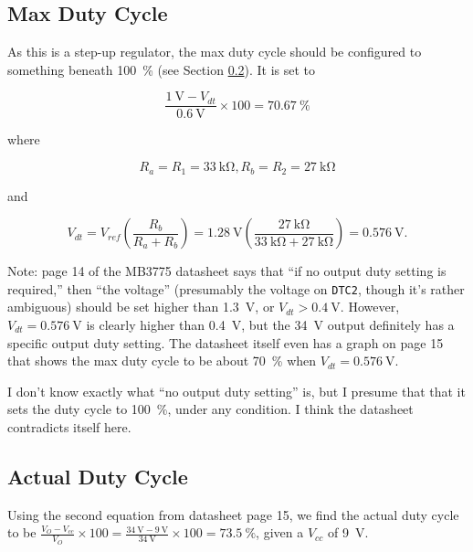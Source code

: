 \documentclass{article}
\newcommand{\Vcc}{$V_{cc}$}
\newcommand{\chippin}{\texttt}
\newcommand{\model}{\textsf}
\begin{document}
\subsection{Max Duty Cycle}
As this is a step-up regulator, the max duty cycle should be
configured to something beneath \qty{100}{\%} (see Section
\ref{sec:34v_actual_duty_cycle}). It is set to

\begin{displaymath}
  \frac{\qty{1}{\volt} - V_{dt}}{\qty{0.6}{\volt}} \times{} 100 = \qty{70.67}{\%}
\end{displaymath}

\noindent
where

\begin{displaymath}
  R_a = R_1 = \qty{33}{\kilo\ohm},R_b = R_2 = \qty{27}{\kilo\ohm}
\end{displaymath}

\noindent
and

\begin{displaymath}
  V_{dt} =  V_{ref}\left(\frac{R_b}{R_a+R_b}\right) =
  \qty{1.28}{\volt}\left(\frac{\qty{27}{\kilo\ohm}}{\qty{33}{\kilo\ohm} +
      \qty{27}{\kilo\ohm}}\right) = \qty{0.576}{\volt}.
\end{displaymath}

Note: page 14 of the \model{MB3775} datasheet says that ``if no output
duty setting is required,'' then ``the voltage'' (presumably the
voltage on \chippin{DTC2}, though it's rather ambiguous) should be set
higher than \qty{1.3}{\volt}, or $V_{dt} > \qty{0.4}{\volt}$. However,
$V_{dt} = \qty{0.576}{\volt}$ is clearly higher than \qty{0.4}{\volt},
but the \qty{34}{\volt} output definitely has a specific output duty
setting. The datasheet itself even has a graph on page 15 that shows
the max duty cycle to be about \qty{70}{\%} when
$V_{dt} = \qty{0.576}{\volt}$.

I don't know exactly what ``no output duty setting'' is, but I presume
that that it sets the duty cycle to \qty{100}{\%}, under any
condition. I think the datasheet contradicts itself here.

\subsection{Actual Duty Cycle}
\label{sec:34v_actual_duty_cycle}
Using the second equation from datasheet page 15, we find the actual
duty cycle to be
$\frac{V_O - V_{cc}}{V_O} \times{} 100 = \frac{\qty{34}{\volt} -
  \qty{9}{\volt}}{\qty{34}{\volt}} \times{} 100 = \qty{73.5}{\%}$,
given a \Vcc{} of \qty{9}{\volt}.
\end{document}
